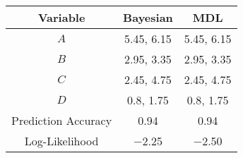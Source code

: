 \scriptsize
\begin{tabular}{@{}ccc@{}}
    \toprule
    Variable & Bayesian & MDL \\
    \midrule
    $A$ & \num{5.45}, \num{6.15} & \num{5.45}, \num{6.15} \\
    $B$ & \num{2.95}, \num{3.35} & \num{2.95}, \num{3.35} \\
    $C$ & \num{2.45}, \num{4.75} & \num{2.45}, \num{4.75} \\
    $D$ & \num{0.8}, \num{1.75} & \num{0.8}, \num{1.75} \\
    \midrule
    Prediction Accuracy & \num{0.94} & \num{0.94} \\
    Log-Likelihood & \num{-2.25} & \num{-2.50} \\
    \bottomrule
\end{tabular}